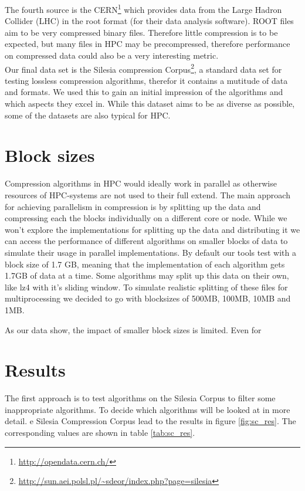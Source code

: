 \documentclass[
	12pt,
	a4paper,
	BCOR10mm,
	DIV14,
	listof=totoc,
	bibliography=totoc,
	headsepline
]{scrreprt}
\begin{document}
The fourth source is the CERN\footnote{\url{http://opendata.cern.ch/}} which provides data from the Large Hadron Collider (LHC) in the root format (for their data analysis software).
ROOT files aim to be very compressed binary files. Therefore little compression is to be expected, but many files in HPC may be precompressed, therefore performance on compressed data could also be a very interesting metric.
\\

Our final data set is the Silesia compression Corpus\footnote{\url{http://sun.aei.polsl.pl/~sdeor/index.php?page=silesia}}, a standard data set for testing lossless compression algorithms, therefor it contains a mutitude of data and formats. We used this to gain an initial impression of the algorithms and which aspects they excel in. While this dataset aims to be as diverse as possible, some of the datasets are also typical for HPC.
\\

\newpage
\section*{Block sizes}
Compression algorithms in HPC would ideally work in parallel as otherwise resources of HPC-systems are not used to their full extend.
The main approach for achieving parallelism in compression is by splitting up the data and compressing each the blocks individually on a different core or node.
While we won't explore the implementations for splitting up the data and distributing it we can access the performance of different algorithms on smaller blocks of data to simulate their usage in parallel implementations.
By default our tools test with a block size of 1.7 GB, meaning that the implementation of each algorithm gets 1.7GB of data at a time. 
Some algorithms may split up this data on their own, like lz4 with it's sliding window. %
To simulate realistic splitting of these files for multiprocessing we decided to go with blocksizes of 500MB, 100MB, 10MB and 1MB.


As our data show, the impact of smaller block sizes is limited. Even for %


\section*{Results}
The first approach is to test algorithms on the Silesia Corpus to filter some inappropriate algorithms. To decide which algorithms will be looked at in more detail.
e Silesia Compression Corpus lead to the results in figure \ref{fig:sc_res}. 
The corresponding values are shown in table \ref{tab:sc_res}. \\
\end{document}
